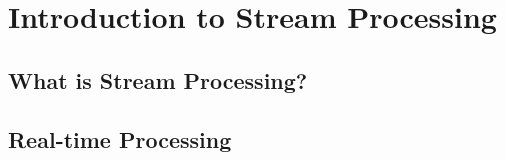 \chapter{Introduction to Stream Processing}
\section{What is Stream Processing?}
\section{Real-time Processing}

